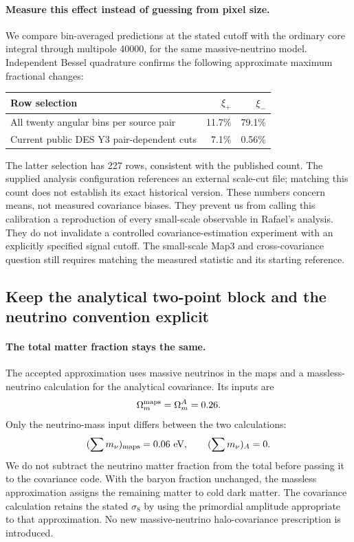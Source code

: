 \documentclass[11pt]{article}
\begin{document}
\paragraph{Measure this effect instead of guessing from pixel size.}
We compare bin-averaged predictions at the stated cutoff with the ordinary
core integral through multipole 40000, for the same massive-neutrino model.
Independent Bessel quadrature confirms the following approximate maximum
fractional changes:
\begin{center}
\begin{tabular}{lrr}
\toprule
Row selection & $\xi_+$ & $\xi_-$\\
\midrule
All twenty angular bins per source pair & 11.7\% & 79.1\%\\
Current public DES Y3 pair-dependent cuts & 7.1\% & 0.56\%\\
\bottomrule
\end{tabular}
\end{center}
The latter selection has 227 rows, consistent with the published count.
The supplied analysis configuration references an external scale-cut
file; matching this count does not establish its exact historical version.
These numbers concern means, not measured covariance biases. They prevent
us from calling this calibration a reproduction of every small-scale
observable in Rafael's analysis. They do not invalidate a controlled
covariance-estimation experiment with an explicitly specified signal
cutoff. The small-scale Map3 and cross-covariance question still requires
matching the measured statistic and its starting reference.

\subsection{Keep the analytical two-point block and the neutrino convention explicit}
\paragraph{The total matter fraction stays the same.}
The accepted approximation uses massive neutrinos in the maps and a
massless-neutrino calculation for the analytical covariance. Its inputs are
\begin{equation}
 \Omega_m^{\rm maps}=\Omega_m^{A}=0.26.
\end{equation}
Only the neutrino-mass input differs between the two calculations:
\begin{equation}
 (\sum m_\nu)_{\rm maps}=0.06\ {\rm eV},\qquad
 (\sum m_\nu)_{A}=0.
\end{equation}
We do not subtract the neutrino matter fraction from the total before
passing it to the covariance code. With the baryon fraction unchanged,
the massless approximation assigns the remaining matter to cold dark
matter. The covariance calculation retains the stated $\sigma_8$ by using
the primordial amplitude appropriate to that approximation. No new
massive-neutrino halo-covariance prescription is introduced.
\end{document}
